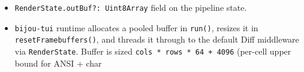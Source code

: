 \begin{itemize}
\tightlist
\item
  \texttt{R\allowbreak{}e\allowbreak{}n\allowbreak{}d\allowbreak{}e\allowbreak{}r\allowbreak{}S\allowbreak{}t\allowbreak{}a\allowbreak{}t\allowbreak{}e\allowbreak{}.\allowbreak{}o\allowbreak{}u\allowbreak{}t\allowbreak{}B\allowbreak{}u\allowbreak{}f\allowbreak{}?\allowbreak{}:\allowbreak{} \allowbreak{}U\allowbreak{}i\allowbreak{}n\allowbreak{}t\allowbreak{}8\allowbreak{}A\allowbreak{}r\allowbreak{}r\allowbreak{}a\allowbreak{}y} field on the pipeline state.
\item
  \texttt{b\allowbreak{}i\allowbreak{}j\allowbreak{}o\allowbreak{}u\allowbreak{}-\allowbreak{}t\allowbreak{}u\allowbreak{}i} runtime allocates a pooled buffer in \texttt{r\allowbreak{}u\allowbreak{}n\allowbreak{}(\allowbreak{})}, resizes it in \texttt{r\allowbreak{}e\allowbreak{}s\allowbreak{}e\allowbreak{}t\allowbreak{}F\allowbreak{}r\allowbreak{}a\allowbreak{}m\allowbreak{}e\allowbreak{}b\allowbreak{}u\allowbreak{}f\allowbreak{}f\allowbreak{}e\allowbreak{}r\allowbreak{}s\allowbreak{}(\allowbreak{})}, and threads it through to the default Diff middleware via \texttt{R\allowbreak{}e\allowbreak{}n\allowbreak{}d\allowbreak{}e\allowbreak{}r\allowbreak{}S\allowbreak{}t\allowbreak{}a\allowbreak{}t\allowbreak{}e}. Buffer is sized \texttt{c\allowbreak{}o\allowbreak{}l\allowbreak{}s\allowbreak{} \allowbreak{}*\allowbreak{} \allowbreak{}r\allowbreak{}o\allowbreak{}w\allowbreak{}s\allowbreak{} \allowbreak{}*\allowbreak{} \allowbreak{}6\allowbreak{}4\allowbreak{} \allowbreak{}+\allowbreak{} \allowbreak{}4\allowbreak{}0\allowbreak{}9\allowbreak{}6} (per-cell upper bound for ANSI + char


\end{itemize}
